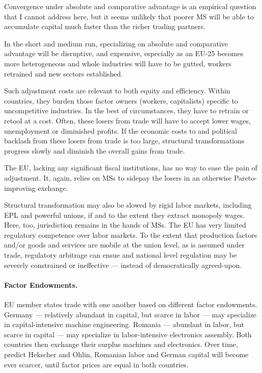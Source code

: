 Convergence under absolute and comparative advantage is an empirical question that I cannot address here, but it seems unlikely that poorer \gls{MS} will be able to accumulate capital much faster than the richer trading partners.

In the short and medium run, specializing on absolute and comparative advantage will be disruptive, and expensive, especially as an \gls{EU}-25 becomes more heterogeneous and whole industries will have to be gutted, workers retrained and new sectors established.

Such adjustment costs are relevant to both equity and efficiency.
Within countries, they burden those factor owners (workers, capitalists) specific to uncompetitive industries.
In the best of circumstances, they have to retrain or retool at a cost.
Often, these losers from trade will have to accept lower wages, unemployment or diminished profits.
If the economic costs to and political backlash from these losers from trade is too large, structural transformations progress slowly and diminish the overall gains from trade.

The \gls{EU}, lacking any significant fiscal institutions, has no way to ease the pain of adjustment.
It, again, relies on \glspl{MS} to sidepay the losers in an otherwise Pareto-improving exchange.

Structural transformation may also be slowed by rigid labor markets, including \gls{EPL} and powerful unions, if and to the extent they extract monopoly wages.
Here, too, jurisdiction remains in the hands of \glspl{MS}.
The \gls{EU} has very limited regulatory competence over labor markets.
To the extent that production factors and/or goods and services are mobile at the union level, as is assumed under trade, regulatory arbitrage can ensue and national level regulation may be severely constrained or ineffective --- instead of democratically agreed-upon.

\paragraph{Factor Endowments.} \gls{EU} member states trade with one another based on different factor endowments.
Germany --- relatively abundant in capital, but scarce in labor --- may specialize in capital-intensive machine engineering.
Romania --- abundant in labor, but scarce in capital --- may specialize in labor-intensive electronics assembly.
Both countries then exchange their surplus machines and electronics.
Over time, predict Hekscher and Ohlin, Romanian labor and German capital will become ever scarcer, until factor prices are equal in both countries.

